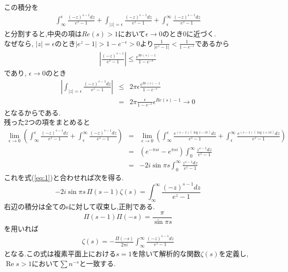 この積分を
\begin{align}
\int_{\infty}^\epsilon \frac{(-z)^{s-1}dz}{e^z-1}+\int_{|z|=\epsilon} \frac{(-z)^{s-1}dz}{e^z-1}+\int_\epsilon^{\infty} \frac{(-z)^{s-1}dz}{e^z-1}\label{eq:2}
\end{align}
と分割すると,中央の項は$Re(s)>1$において$\epsilon\to0$のとき0に近づく.\\
なぜなら, $|z|=\epsilon$のとき$|e^z-1|>1-e^{-\epsilon}>0$より$\frac{1}{|e^z-1|}<\frac{1}{1-e^{-\epsilon}}$であるから
\begin{eqnarray*}
\left|\frac{(-z)^{s-1}}{e^z-1}\right| \le \frac{\epsilon^{Re(s)-1}}{1-e^{-\epsilon}}
\end{eqnarray*}
であり, $\epsilon\to0$のとき
\begin{eqnarray*}
\left|\int_{|z|=\epsilon} \frac{(-z)^{s-1}dz}{e^z-1}\right| &\le& 2\pi\epsilon \frac{\epsilon^{Re(s)-1}}{1-e^{-\epsilon}}\\
&=& 2\pi\frac{\epsilon}{1-e^{-\epsilon}}\epsilon^{Re(s)-1}\to0
\end{eqnarray*}
となるからである.\\
残った2つの項をまとめると
\begin{eqnarray*}
\lim_{\epsilon \to 0}\left(\int_{\infty}^\epsilon \frac{(-z)^{s-1}dz}{e^z-1}+\int_\epsilon^{\infty} \frac{(-z)^{s-1}dz}{e^z-1}\right) &=& \lim_{\epsilon \to 0}\left(\int_{\infty}^\epsilon \frac{e^{(s-1)(\log z-i\pi)}dz}{e^z-1}+\int_\epsilon^{\infty} \frac{e^{(s-1)(\log z+i\pi)}dz}{e^z-1}\right)\\
&=& (e^{-\pi si}-e^{\pi si}) \int_0^\infty \frac{z^{s-1}dz}{e^z-1}\\
&=& -2i\sin{\pi s}\int_0^\infty \frac{z^{s-1}dz}{e^z-1}
\end{eqnarray*}
これを式(\ref{eq:1})と合わせれば次を得る.
\[
-2i\sin{\pi s}\,\Pi(s-1)\zeta(s)=\int_\infty^\infty \frac{(-z)^{s-1}dz}{e^z-1}
\]
右辺の積分は全てのsに対して収束し,正則である.\\
\[
\Pi(s-1)\Pi(-s)=\frac{\pi}{\sin{\pi s}}
\]
を用いれば
\begin{align}
\zeta(s)=-\frac{\Pi(-s)}{2\pi i}\int_{\infty}^{\infty} \frac{(-z)^{s-1}dz}{e^z-1}\label{eq:3}
\end{align}
となる.この式は複素平面上における$s=1$を除いて解析的な関数$\zeta(s)$を定義し, $\operatorname{Re} s>1$において$\sum n^{-s}$と一致する.\\

